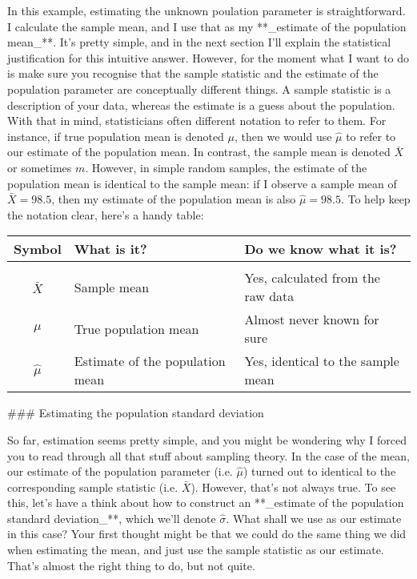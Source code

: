 In this example, estimating the unknown poulation parameter is straightforward. I calculate the sample mean, and I use that as my **_estimate of the population mean_**. It's pretty simple, and in the next section I'll explain the statistical justification for this intuitive answer. However, for the moment what I want to do is make sure you recognise that the sample statistic and the estimate of the population parameter are conceptually different things. A sample statistic is a description of your data, whereas the estimate is a guess about the population. With that in mind, statisticians often different notation to refer to them. For instance, if true population mean is denoted $\mu$, then we would use $\hat\mu$ to refer to our estimate of the population mean. In contrast, the sample mean is denoted $\bar{X}$ or sometimes $m$. However, in simple random samples, the estimate of the population mean is identical to the sample mean: if I observe a sample mean of $\bar{X} = 98.5$, then my estimate of the population mean is also $\hat\mu = 98.5$. To help keep the notation clear, here's a handy table:

\smallskip
\begin{center}
\small 
\begin{tabular}{cll}
Symbol & What is it? & Do we know what it is? \\ \hline \\[-6pt]
$\bar{X}$ & Sample mean & Yes, calculated from the raw data \\
$\mu$ & True population mean & Almost never known for sure \\
$\hat{\mu}$ & Estimate of the population mean & Yes, identical to the sample mean
\end{tabular}
\end{center}


### Estimating the population standard deviation

So far, estimation seems pretty simple, and you might be wondering why I forced you to read through all that stuff about sampling theory. In the case of the mean, our estimate of the population parameter (i.e. $\hat\mu$) turned out to identical to the corresponding sample statistic (i.e. $\bar{X}$). However, that's not always true. To see this, let's have a think about how to construct an **_estimate of the population standard deviation_**, which we'll denote  $\hat\sigma$. What shall we use as our estimate in this case? Your first thought might be that we could do the same thing we did when estimating the mean, and just use the sample statistic as our estimate. That's almost the right thing to do, but not quite. 

